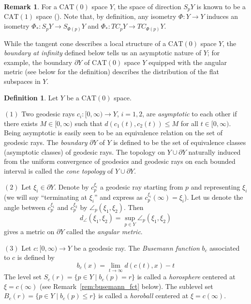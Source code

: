 \documentclass[12pt]{amsart}
\numberwithin{equation}{section}
\theoremstyle{plain}
\theoremstyle{definition}
\newtheorem{Definition}[Theorem]{Definition}
\newtheorem{Remark}[Theorem]{Remark}
\theoremstyle{remark}
\newcommand{\cat}[1]{\mathrm{CAT}(#1)}
\newcommand{\ray}[1]{[#1)}
\newcommand{\cc}[2]{c_{#1}^{#2}}
\begin{document}
\begin{Remark}
 For a $\cat{0}$ space $Y$, the space of direction $S_pY$ is known to be
 a $\cat{1}$ space (\cite[p.~191, 3.19 Theorem]{bridson-haefliger}). 
 Note that, by definition, any isometry $\Phi\colon Y \rightarrow Y$
 induces an isometry $\Phi_* \colon S_pY \rightarrow S_{\Phi(p)}Y$ and 
 $\Phi_*\colon TC_pY \rightarrow TC_{\Phi(p)}Y$. 
\end{Remark}

%
%
While the tangent cone describes a local structure of a $\cat{0}$
space $Y$, the {\it boundary at infinity} defined below tells us an
asymptotic nature of $Y$; for example, 
the boundary $\partial Y$ of $\cat{0}$ space $Y$
equipped with the angular metric (see below for the definition)
describes the distribution of the flat subspaces in $Y$. 

\begin{Definition}
\label{defn:boundary}
 Let $Y$ be a $\cat{0}$ space.

$(1)$ Two geodesic rays $c_i\colon \ray{0,\infty}\rightarrow Y$,
 $i=1,2$, are {\it asymptotic} to each other if there exists
 $M\in\ray{0,\infty}$ such that $d(c_1(t),c_2(t))\leq M$ for all 
 $t \in \ray{0,\infty}$. 
 Being asymptotic is easily seen to be an equivalence relation on the set
 of geodesic rays. The {\it boundary} $\partial Y$ of $Y$ is defined to
 be the set of equivalence classes (asymptotic classes) of geodesic
 rays. 
 The topology on $Y \cup \partial Y$ naturally induced from 
 the uniform convergence of geodesics and geodesic rays on each bounded
 interval is called the {\it cone topology} of $Y \cup \partial Y$. 

$(2)$ Let $\xi_i \in \partial Y$.  Denote by $\cc{p}{\xi_i}$ a geodesic
 ray starting from $p$ and representing $\xi_i$ (we will say
 ``terminating at $\xi_i$'' and express as
 $\cc{p}{\xi_i}(\infty)=\xi_i$).  
 Let us denote the angle between
 $\cc{p}{\xi_1}$ and $\cc{p}{\xi_2}$ by $\angle_p(\xi_1,\xi_2)$. 
 Then
\begin{equation*}
 d_{\angle}(\xi_1,\xi_2)=\sup_{p \in Y} \angle_p(\xi_1,\xi_2)
\end{equation*}
 gives a metric on $\partial Y$ called the {\it angular metric}. 

$(3)$  Let $c\colon \ray{0,\infty}\rightarrow Y$ be a geodesic ray. 
 The {\it Busemann function} $b_c$ associated to $c$ is defined by
\begin{equation*}
 b_c (x) =\lim_{t \to \infty} d(c(t),x)-t
\end{equation*}
 The level set $S_c(r)=\{p \in Y \mid b_{c}(p)=r\}$ is called a
 {\it horosphere} centered at $\xi=c(\infty)$ (see
 Remark~\ref{rem:busemann_fct} below). 
 The sublevel set $B_c(r)=\{p \in Y \mid b_{c}(p)\leq r\}$ is
 called a {\it horoball} centered at $\xi=c(\infty)$. 
\end{Definition}
\end{document}
